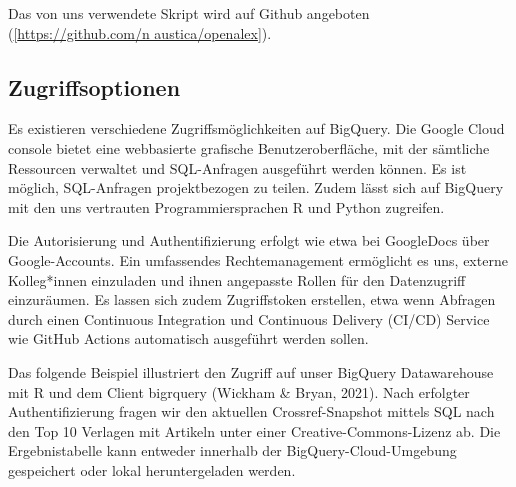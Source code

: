 \documentclass[a4paper,
fontsize=11pt,
oneside,
numbers=noperiodatend,
parskip=half-,
bibliography=totoc,
final
]{scrartcl}
\begin{document}
\begin{longtable}[]
Das von uns verwendete Skript wird auf Github angeboten
(\href{https://github.com\%20/naustica/openalex}{{[}https://github.com/n
austica/openalex{]}}). \\
\bottomrule
\end{longtable}

\hypertarget{zugriffsoptionen}{%
\subsection{Zugriffsoptionen}\label{zugriffsoptionen}}

Es existieren verschiedene Zugriffsmöglichkeiten auf BigQuery. Die
Google Cloud console bietet eine webbasierte grafische
Benutzeroberfläche, mit der sämtliche Ressourcen verwaltet und
SQL-Anfragen ausgeführt werden können. Es ist möglich, SQL-Anfragen
projektbezogen zu teilen. Zudem lässt sich auf BigQuery mit den uns
vertrauten Programmiersprachen R und Python zugreifen.

Die Autorisierung und Authentifizierung erfolgt wie etwa bei GoogleDocs
über Google-Accounts. Ein umfassendes Rechtemanagement ermöglicht es
uns, externe Kolleg*innen einzuladen und ihnen angepasste Rollen für den
Datenzugriff einzuräumen. Es lassen sich zudem Zugriffstoken erstellen,
etwa wenn Abfragen durch einen Continuous Integration und Continuous
Delivery (CI/CD) Service wie GitHub Actions automatisch ausgeführt
werden sollen.

Das folgende Beispiel illustriert den Zugriff auf unser BigQuery
Datawarehouse mit R und dem Client bigrquery (Wickham \& Bryan, 2021).
Nach erfolgter Authentifizierung fragen wir den aktuellen
Crossref-Snapshot mittels SQL nach den Top 10 Verlagen mit Artikeln
unter einer Creative-Commons-Lizenz ab. Die Ergebnistabelle kann
entweder innerhalb der BigQuery-Cloud-Umgebung gespeichert oder lokal
heruntergeladen werden.
\end{document}
